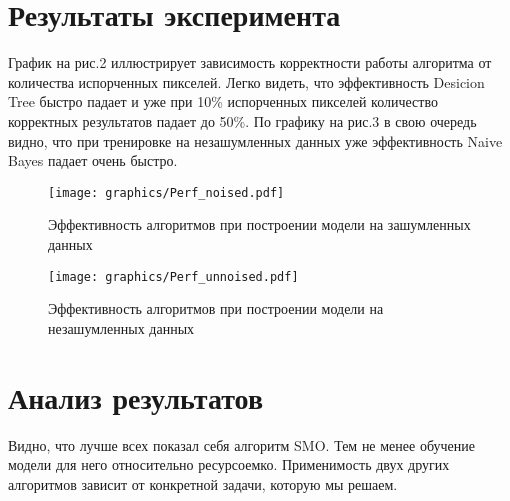 \documentclass{article}
\begin{document}
\section{Результаты эксперимента}
График на рис.2 иллюстрирует зависимость корректности работы алгоритма от количества испорченных пикселей. Легко видеть, что эффективность Desicion Tree быстро падает и уже при 10\% испорченных пикселей количество корректных результатов падает до 50\%.
По графику на рис.3 в свою очередь видно, что при тренировке на незашумленных данных уже эффективность Naive Bayes падает очень быстро.
\begin{figure}[ht]
\texttt{[image: graphics/Perf\_noised.pdf]}
\captionsetup{justification=centering}
\caption{Эффективность алгоритмов при построении модели на зашумленных данных}
\end{figure}
\begin{figure}[ht!]
\texttt{[image: graphics/Perf\_unnoised.pdf]}
\captionsetup{justification=centering}
\caption{Эффективность алгоритмов при построении модели на незашумленных данных}
\end{figure}
\clearpage
\section{Анализ результатов}
Видно, что лучше всех показал себя алгоритм SMO. Тем не менее обучение модели для него относительно ресурсоемко. Применимость двух других алгоритмов зависит от конкретной задачи, которую мы решаем.

{}
\end{document}
